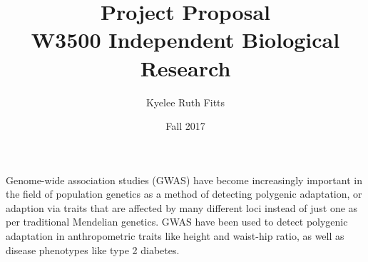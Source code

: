 \documentclass[a4paper,10pt]{article}
\begin{document}
\title{\vspace{-2.0cm}
  Project Proposal \\
  \large W3500 Independent Biological Research \\
}

\author{
  Kyelee Ruth Fitts
}

\date{Fall 2017}
  
\maketitle

%
%
%
%

Genome-wide association studies (GWAS) have become increasingly
important in the field of population genetics as a method of detecting
polygenic adaptation, or adaption via traits that are affected by many
different loci instead of just one as per traditional Mendelian
genetics. GWAS have been used to detect polygenic adaptation in anthropometric traits like height
and waist-hip ratio, as well as disease phenotypes like type 2
diabetes\cite{gwasintro,gwasproblems}.
\end{document}
